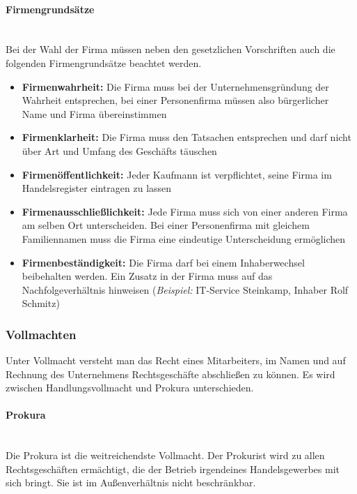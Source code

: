 \paragraph{Firmengrundsätze}~\\
Bei der Wahl der Firma müssen neben den gesetzlichen Vorschriften auch die folgenden Firmengrundsätze beachtet werden.

\begin{itemize}
	\item {\bf Firmenwahrheit:} Die Firma muss bei der Unternehmensgründung der Wahrheit entsprechen, bei einer Personenfirma müssen also bürgerlicher Name und Firma übereinstimmen
	\item {\bf Firmenklarheit:} Die Firma muss den Tatsachen entsprechen und darf nicht über Art und Umfang des Geschäfts täuschen
	\item {\bf Firmenöffentlichkeit:} Jeder Kaufmann ist verpflichtet, seine Firma im Handelsregister eintragen zu lassen
	\item {\bf Firmenausschließlichkeit:} Jede Firma muss sich von einer anderen Firma am selben Ort unterscheiden. Bei einer Personenfirma mit gleichem Familiennamen muss die Firma eine eindeutige Unterscheidung ermöglichen
	\item {\bf Firmenbeständigkeit:} Die Firma darf bei einem Inhaberwechsel beibehalten werden. Ein Zusatz in der Firma muss auf das Nachfolgeverhältnis hinweisen ({\it Beispiel:} IT-Service Steinkamp, Inhaber Rolf Schmitz)
\end{itemize}

\subsubsection{Vollmachten}
Unter Vollmacht versteht man das Recht eines Mitarbeiters, im Namen und auf Rechnung des Unternehmens Rechtsgeschäfte abschließen zu können. Es wird zwischen Handlungsvollmacht und Prokura unterschieden.
	
\paragraph{Prokura}~\\
Die Prokura ist die weitreichendste Vollmacht. Der Prokurist wird zu allen Rechtsgeschäften ermächtigt, die der Betrieb irgendeines Handelsgewerbes mit sich bringt. Sie ist im Außenverhältnis nicht beschränkbar.
	
